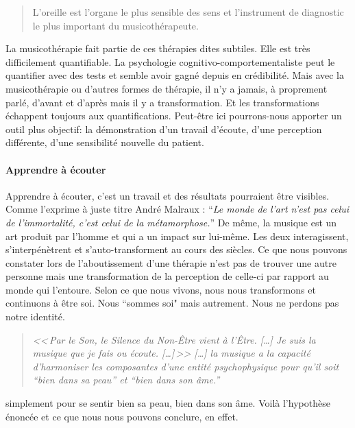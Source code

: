  
\begin{quotation}
	L'oreille est l'organe le plus sensible des sens 
et l'instrument de diagnostic  le plus important du
musicothérapeute.\autocite{seminar_zuerich}
 	
\end{quotation}
La musicothérapie fait partie de ces thérapies dites subtiles. Elle
est très difficilement quantifiable. La
psychologie cognitivo-comportementaliste peut le quantifier avec des tests et semble avoir gagné depuis en crédibilité. Mais avec la musicothérapie ou d'autres formes de thérapie, il n'y a
jamais, à proprement parlé, d'avant et d'après mais il y a transformation.
Et les transformations échappent toujours aux quantifications. Peut-être
ici pourrons-nous apporter un outil plus objectif: la démonstration d'un travail d'écoute, d'une perception
différente, d'une sensibilité nouvelle du patient. 



% 

\paragraph{Apprendre à écouter}

Apprendre à écouter,
c'est un travail et des résultats pourraient être visibles.
Comme l'exprime à juste titre André Malraux : \enquote{\emph{Le monde de
	l'art n'est pas celui de l'immortalité, c'est celui de la métamorphose.}}
De même, la musique est un art produit par l'homme et qui a un impact
sur lui-même. Les deux interagissent, s'interpénètrent et s'auto-transforment
au cours des siècles.
 Ce que nous pouvons constater lors de l'aboutissement
d'une thérapie n'est pas de trouver une autre personne mais une transformation
de la perception de celle-ci par rapport au monde qui l'entoure. 
Selon
ce que nous vivons, nous nous transformons et continuons à être
soi. Nous ``sommes soi" mais autrement. Nous ne perdons
pas notre identité.


\label{jeSuisLaMusique:viret}
\begin{quotation}
\emph{<<\,\emph{Par le Son, le Silence du Non-Être vient à l'Être}. [\dots] 
\textsl{Je suis}
	\emph{la musique que je fais ou écoute}. [\dots]\,>>
[\ldots] \emph{la musique a la capacité d'harmoniser
les composantes d'une entité psychophysique pour qu'il soit ``bien
dans sa peau'' et ``bien dans son âme.}''}\, \autocite[ch. 1,  p. 8]{viret:b}
\end{quotation}


simplement pour se
sentir bien sa peau, bien dans son âme.
Voilà l'hypothèse énoncée et ce que nous nous pouvons conclure, en effet.

